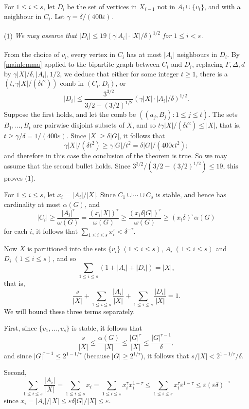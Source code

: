 \documentclass[titlepage,11pt]{article}
\def\ll{,\ldots,}
\def\cupcup{\cup\cdots\cup}
\newcommand{\vare}{\varepsilon}
\begin{document}
For $1\le i\le s$, let $D_i$ be the set of vertices in $X_{i-1}$ not in $A_i\cup \{v_i\}$,
and with a neighbour in $C_i$. Let $\gamma= \delta/(400\vare)$.
\\
\\
(1) {\em We may assume that $|D_i|\le 19\left(\gamma|A_i|\cdot |X|/\delta\right)^{1/2}$ for $1\le i< s$.}
\\
\\
From the choice of $v_i$, every vertex in $C_i$ has at most $|A_i|$ neighbours in $D_i$.
By \ref{mainlemma} applied to the bipartite graph between $C_i$ and $D_i$, replacing $\Gamma, \Delta, d$ by 
$\gamma|X|/\delta,|A_i|, 1/2$, 
we deduce that either
for some integer $t\ge 1$, there is a $(t,\gamma|X|/(\delta t^2))$-comb in $(C_i,D_i)$,
or
$$|D_i|\le \frac{3^{3/2}}{3/2-(3/2)^{1/2}} (\gamma|X|\cdot|A_i|/\delta)^{1/2}.$$
Suppose the first  holds, and let the comb be $((a_j, B_j):1\le j\le t)$. The sets $B_1\ll B_t$
are pairwise disjoint subsets of $X$, and 
so $t\gamma|X|/(\delta t^2)\le |X|$, that is, $t\ge \gamma/\delta=1/(400\vare)$. Since $|X|\ge \delta|G|$,
it follows that 
$$\gamma|X|/(\delta t^2)\ge \gamma|G|/t^2=\delta |G|/(400\epsilon t^2);$$ 
and therefore in this case
the conclusion of the theorem is true.
So we may assume that the second bullet holds. Since $3^{3/2}/(3/2-(3/2)^{1/2})\le 19$, this proves (1).

\bigskip

For $1\le i\le s$, let $x_i=|A_i|/|X|$.
Since $C_1\cupcup C_{s}$ is stable, and hence has cardinality at most $\alpha(G)$, and 
$$|C_i|\ge \frac{|A_i|^{\tau}}{\omega(G)}= \frac{(x_i|X|)^{\tau}}{\omega(G)}\ge \frac{(x_i\delta|G|)^{\tau}}{\omega(G)}\ge (x_i\delta)^\tau\alpha(G)$$
for each $i$, it follows that 
$\sum_{1\le i\le s} x_i^{\tau}< \delta^{-\tau}$.

Now $X$ is partitioned into the sets $\{v_i\}\;(1\le i\le s)$, $A_i\;(1\le i\le s)$ and $D_i\;(1\le i\le s)$, and so
$$\sum_{1\le i\le s}(1+|A_i|+|D_i|)=|X|,$$
that is,
$$\frac{s}{|X|}+\sum_{1\le i\le s}\frac{|A_i|}{|X|} + \sum_{1\le i\le s}\frac{|D_i|}{|X|}=1.$$
We will bound these three terms separately.

First, since $\{v_1\ll v_s\}$ is stable, it follows that 
$$\frac{s}{|X|}\le \frac{\alpha(G)}{|X|}\le \frac{|G|^\tau}{|X|}\le \frac{|G|^{\tau-1}}{\delta},$$
and since $|G|^{\tau-1}\le 2^{1-1/\tau}$ (because $|G|\ge 2^{1/\tau}$),
it follows that $s/|X|< 2^{1-1/\tau}/\delta$.

Second, 
$$\sum_{1\le i\le s}\frac{|A_i|}{|X|}=\sum_{1\le i\le s}x_i=\sum_{1\le i\le s}x_i^{\tau}x_i^{1-\tau}\le \sum_{1\le i\le s}x_i^{\tau}\vare^{1-\tau}\le \vare(\vare\delta)^{-\tau}$$
since $x_i=|A_i|/|X|\le \vare\delta|G|/|X|\le \vare$.
\end{document}
